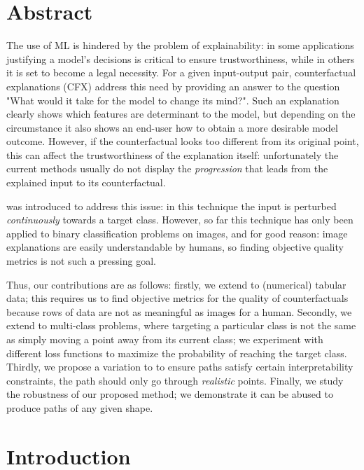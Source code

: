 \documentclass[../main.tex]{subfiles}
\begin{document}
\section{Abstract}

The use of ML is hindered by the problem of explainability: in some applications justifying a model's decisions is critical to ensure trustworthiness, while in others it is set to become a legal necessity.
For a given input-output pair, counterfactual explanations (CFX) address this need by providing an answer to the question "What would it take for the model to change its mind?".
Such an explanation clearly shows which features are determinant to the model, but depending on the circumstance it also shows an end-user how to obtain a more desirable model outcome. 
However, if the counterfactual looks too different from its original point, this can affect the trustworthiness of the explanation itself: unfortunately the current methods usually do not display the \emph{progression} that leads from the explained input to its counterfactual.

\ls{} was introduced to address this issue: in this technique the input is perturbed \emph{continuously} towards a target class.
However, so far this technique has only been applied to binary classification problems on images, and for good reason: image explanations are easily understandable by humans, so finding objective quality metrics is not such a pressing goal.

Thus, our contributions are as follows: firstly, we extend \ls{} to (numerical) tabular data; this requires us to find objective metrics for the quality of counterfactuals because rows of data are not as meaningful as images for a human.
Secondly, we extend \ls{} to multi-class problems, where targeting a particular class is not the same as simply moving a point away from its current class; we experiment with different loss functions to maximize the probability of reaching the target class.
Thirdly, we propose a variation to \ls{} to ensure paths satisfy certain interpretability constraints, \eg{} the path should only go through \emph{realistic} points.
Finally, we study the robustness of our proposed method; we demonstrate it can be abused to produce paths of any given shape.

\section{Introduction}
\end{document}
